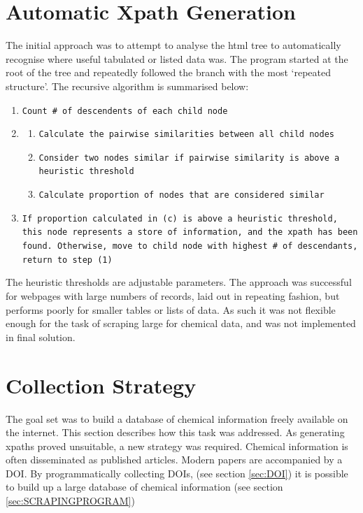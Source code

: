 \section{Automatic Xpath Generation}
The initial approach was to attempt to analyse the html tree to automatically recognise where useful tabulated or listed data was. The program started at the root of the tree and repeatedly followed the branch with the most `repeated structure'. The recursive algorithm is summarised below:
\begin{sloppypar}
\begin{enumerate}
\item \texttt{Count \# of descendents of each child node}
\item \begin{enumerate}
\item \texttt{Calculate the pairwise similarities between all child nodes}
\item \texttt{Consider  two nodes similar if pairwise similarity is above a heuristic threshold}
\item \texttt{Calculate proportion of nodes that are considered similar}
\end{enumerate}
\item \texttt{If proportion calculated in (c) is above a heuristic threshold, this node represents a store of information, and the xpath has been found. Otherwise, move to child node with highest \# of descendants, return to step (1)}
\end{enumerate}
\end{sloppypar}
The heuristic thresholds are adjustable parameters. The approach was successful for webpages with large numbers of records, laid out in repeating fashion, but performs poorly for smaller tables or lists of data. As such it was not flexible enough for the task of scraping large for chemical data, and was not implemented in final solution.
\section{Collection Strategy}
The goal set was to build a database of chemical information freely available on the internet. This section describes how this task was addressed.
As generating xpaths proved unsuitable, a new strategy was required. Chemical information is often disseminated as published articles. Modern papers are accompanied by a DOI. By programmatically collecting DOIs, (see section \ref{sec:DOI}) it is possible to build up a large database of chemical information (see section \ref{sec:SCRAPINGPROGRAM})
